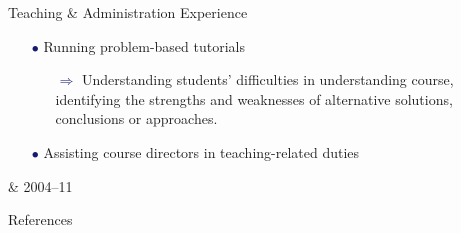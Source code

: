 \documentclass[a4paper,10pt]{article}
\begin{document}
\begin{teachblock}{Teaching \& Administration Experience}
{\begin{itemize}
\item[\textcolor{MidnightBlue}{$\bullet$}] Running problem-based tutorials
\begin{itemize}\addtolength{\itemsep}{-0.25\baselineskip}\addtolength{\parsep}{-2mm}\addtolength{\parskip}{-2mm}
\item[\textcolor{MidnightBlue}{$\boldsymbol{\Rightarrow}$}] Understanding students' difficulties in understanding course, identifying the strengths and weaknesses of alternative solutions, conclusions or approaches.
\end{itemize}
\item[\textcolor{MidnightBlue}{$\bullet$}] Assisting course directors in teaching-related duties
\end{itemize} & 2004--11}%
%
\end{teachblock}
%
\begin{resumeblock}{References}
%
\\
\shortskip
%
\\
\shortskip



\end{resumeblock}
\end{document}
